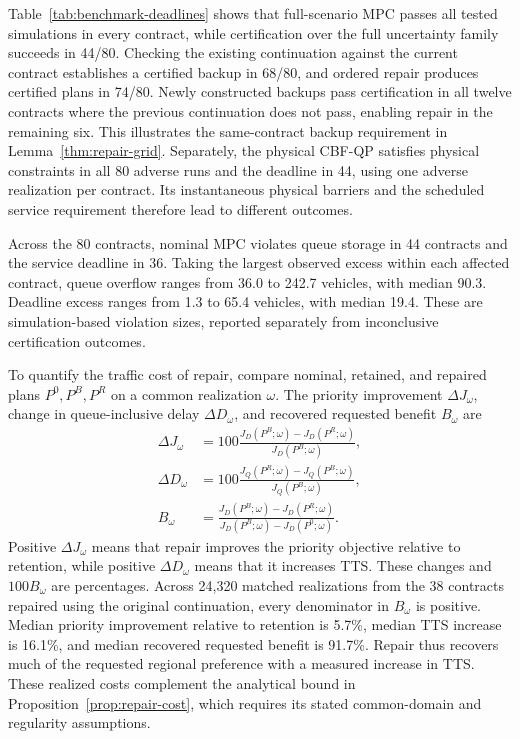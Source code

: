 \documentclass[preprint,12pt]{elsarticle}
\theoremstyle{definition}
\theoremstyle{plain}
\theoremstyle{definition}
\theoremstyle{plain}
\begin{document}
Table~\ref{tab:benchmark-deadlines} shows that full-scenario MPC passes
all tested simulations in every contract, while certification over the full
uncertainty family succeeds in 44/80. Checking the existing continuation against the current
contract establishes a certified backup in 68/80, and ordered repair
produces certified plans in 74/80. Newly constructed backups pass
certification in all twelve contracts where the previous continuation
does not pass, enabling repair in the remaining six. This illustrates
the same-contract backup requirement in Lemma~\ref{thm:repair-grid}.
Separately, the physical CBF-QP satisfies physical constraints in all
80 adverse runs and the deadline in 44, using one adverse realization per
contract. Its instantaneous physical barriers and the scheduled service
requirement therefore lead to different outcomes.

Across the 80 contracts, nominal MPC violates queue storage in 44
contracts and the service deadline in 36. Taking the largest observed
excess within each affected contract, queue overflow ranges from 36.0 to
242.7 vehicles, with median 90.3. Deadline excess ranges from 1.3 to
65.4 vehicles, with median 19.4. These are simulation-based violation sizes,
reported separately from inconclusive certification outcomes.

To quantify the traffic cost of repair, compare nominal, retained, and
repaired plans $P^0,P^B,P^R$ on a common realization $\omega$. The priority
improvement $\Delta J_\omega$, change in queue-inclusive delay
$\Delta D_\omega$, and recovered requested benefit $B_\omega$ are
\begin{equation}
\begin{aligned}
\Delta J_\omega&=100\frac{J_D(P^B;\omega)-J_D(P^R;\omega)}{J_D(P^B;\omega)},\\
\Delta D_\omega&=100\frac{J_Q(P^R;\omega)-J_Q(P^B;\omega)}{J_Q(P^B;\omega)},\\
B_\omega&=\frac{J_D(P^B;\omega)-J_D(P^R;\omega)}{J_D(P^B;\omega)-J_D(P^0;\omega)}.
\end{aligned}
\label{eq:benchmark-repair-metrics}
\end{equation}
Positive $\Delta J_\omega$ means that repair improves the priority
objective relative to retention, while positive $\Delta D_\omega$ means
that it increases TTS. These changes and $100B_\omega$ are percentages.
Across 24,320 matched realizations from the 38 contracts repaired using
the original continuation, every denominator in $B_\omega$ is positive.
Median priority improvement relative to retention is 5.7\%, median TTS
increase is 16.1\%, and median recovered requested benefit is 91.7\%.
Repair thus recovers much of the requested regional preference with a
measured increase in TTS. These realized costs complement the analytical
bound in Proposition~\ref{prop:repair-cost}, which requires its stated
common-domain and regularity assumptions.
\end{document}
